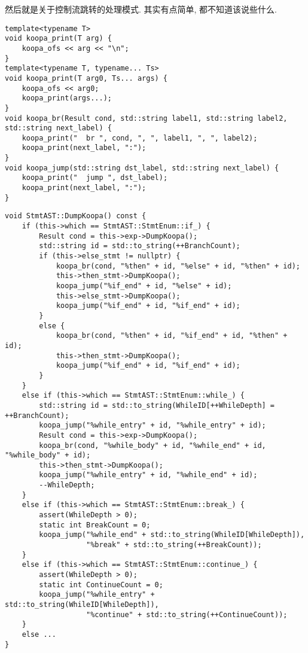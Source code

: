 \documentclass[8pt]{article}
\theoremstyle{compact}
\begin{document}
然后就是关于控制流跳转的处理模式. 其实有点简单, 都不知道该说些什么.

\begin{verbatim}
template<typename T>
void koopa_print(T arg) {
    koopa_ofs << arg << "\n";
}
template<typename T, typename... Ts>
void koopa_print(T arg0, Ts... args) {
    koopa_ofs << arg0;
    koopa_print(args...);
}
void koopa_br(Result cond, std::string label1, std::string label2, std::string next_label) {
    koopa_print("  br ", cond, ", ", label1, ", ", label2);
    koopa_print(next_label, ":");
}
void koopa_jump(std::string dst_label, std::string next_label) {
    koopa_print("  jump ", dst_label);
    koopa_print(next_label, ":");
}
\end{verbatim}
\begin{verbatim}
void StmtAST::DumpKoopa() const {
    if (this->which == StmtAST::StmtEnum::if_) {
        Result cond = this->exp->DumpKoopa();
        std::string id = std::to_string(++BranchCount);
        if (this->else_stmt != nullptr) {
            koopa_br(cond, "%then" + id, "%else" + id, "%then" + id);
            this->then_stmt->DumpKoopa();
            koopa_jump("%if_end" + id, "%else" + id);
            this->else_stmt->DumpKoopa();
            koopa_jump("%if_end" + id, "%if_end" + id);
        }
        else {
            koopa_br(cond, "%then" + id, "%if_end" + id, "%then" + id);
            this->then_stmt->DumpKoopa();
            koopa_jump("%if_end" + id, "%if_end" + id);
        }
    }
    else if (this->which == StmtAST::StmtEnum::while_) {
        std::string id = std::to_string(WhileID[++WhileDepth] = ++BranchCount);
        koopa_jump("%while_entry" + id, "%while_entry" + id);
        Result cond = this->exp->DumpKoopa();
        koopa_br(cond, "%while_body" + id, "%while_end" + id, "%while_body" + id);
        this->then_stmt->DumpKoopa();
        koopa_jump("%while_entry" + id, "%while_end" + id);
        --WhileDepth;
    }
    else if (this->which == StmtAST::StmtEnum::break_) {
        assert(WhileDepth > 0);
        static int BreakCount = 0;
        koopa_jump("%while_end" + std::to_string(WhileID[WhileDepth]),
                   "%break" + std::to_string(++BreakCount));
    }
    else if (this->which == StmtAST::StmtEnum::continue_) {
        assert(WhileDepth > 0);
        static int ContinueCount = 0;
        koopa_jump("%while_entry" + std::to_string(WhileID[WhileDepth]),
                   "%continue" + std::to_string(++ContinueCount));
    }
    else ...
}
        
\end{verbatim}
\end{document}
